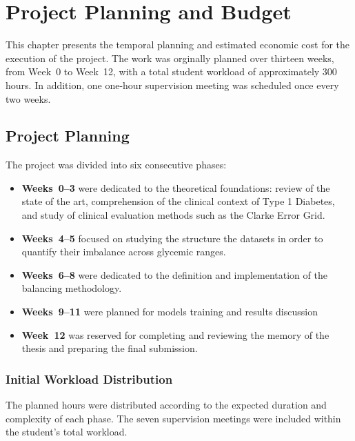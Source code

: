 
\chapter{Project Planning and Budget}
\label{chap:planning_budget}

This chapter presents the temporal planning and estimated economic cost for the execution of the project. The work was orginally planned over thirteen weeks, from Week~0 to Week~12, with a total student workload of approximately 300 hours. In addition, one one-hour supervision meeting was scheduled once every two weeks.

\section{Project Planning}
\label{sec:project_planning}

The project was divided into six consecutive phases:

\begin{itemize}
    \item \textbf{Weeks~0--3} were dedicated to the theoretical foundations: review of the state of the art, comprehension of the clinical context of Type 1 Diabetes, and study of clinical evaluation methods such as the Clarke Error Grid.
    \item \textbf{Weeks~4--5} focused on studying the structure the datasets in order to quantify their imbalance across glycemic ranges.
    \item \textbf{Weeks~6--8} were dedicated to the definition and implementation of the balancing methodology.
    \item \textbf{Weeks~9--11} were planned for models training and results discussion
    \item \textbf{Week~12} was reserved for completing and reviewing the memory of the thesis and preparing the final submission.
\end{itemize} 

\subsection{Initial Workload Distribution}
\label{subsec:initial_workload}

The planned hours were distributed according to the expected duration and complexity of each phase. The seven supervision meetings were included within the student's total workload.

